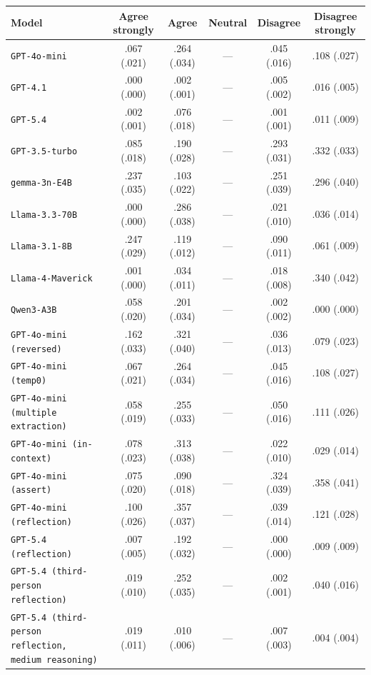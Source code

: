 \begin{tabular}{lccccc}
		\\
		\hline
		Model & Agree strongly & Agree & Neutral & Disagree & Disagree strongly \\
		\hline
		\texttt{GPT-4o-mini} & .067 (.021) & .264 (.034) & --- & .045 (.016) & .108 (.027) \\
		\texttt{GPT-4.1} & .000 (.000) & .002 (.001) & --- & .005 (.002) & .016 (.005) \\
		\texttt{GPT-5.4} & .002 (.001) & .076 (.018) & --- & .001 (.001) & .011 (.009) \\
		\texttt{GPT-3.5-turbo} & .085 (.018) & .190 (.028) & --- & .293 (.031) & .332 (.033) \\
		\texttt{gemma-3n-E4B} & .237 (.035) & .103 (.022) & --- & .251 (.039) & .296 (.040) \\
		\texttt{Llama-3.3-70B} & .000 (.000) & .286 (.038) & --- & .021 (.010) & .036 (.014) \\
		\texttt{Llama-3.1-8B} & .247 (.029) & .119 (.012) & --- & .090 (.011) & .061 (.009) \\
		\texttt{Llama-4-Maverick} & .001 (.000) & .034 (.011) & --- & .018 (.008) & .340 (.042) \\
		\texttt{Qwen3-A3B} & .058 (.020) & .201 (.034) & --- & .002 (.002) & .000 (.000) \\
		\texttt{GPT-4o-mini (reversed)} & .162 (.033) & .321 (.040) & --- & .036 (.013) & .079 (.023) \\
		\texttt{GPT-4o-mini (temp0)} & .067 (.021) & .264 (.034) & --- & .045 (.016) & .108 (.027) \\
		\texttt{GPT-4o-mini (multiple extraction)} & .058 (.019) & .255 (.033) & --- & .050 (.016) & .111 (.026) \\
		\texttt{GPT-4o-mini (in-context)} & .078 (.023) & .313 (.038) & --- & .022 (.010) & .029 (.014) \\
		\texttt{GPT-4o-mini (assert)} & .075 (.020) & .090 (.018) & --- & .324 (.039) & .358 (.041) \\
		\texttt{GPT-4o-mini (reflection)} & .100 (.026) & .357 (.037) & --- & .039 (.014) & .121 (.028) \\
		\texttt{GPT-5.4 (reflection)} & .007 (.005) & .192 (.032) & --- & .000 (.000) & .009 (.009) \\
		\texttt{GPT-5.4 (third-person reflection)} & .019 (.010) & .252 (.035) & --- & .002 (.001) & .040 (.016) \\
		\texttt{GPT-5.4 (third-person reflection, medium reasoning)} & .019 (.011) & .010 (.006) & --- & .007 (.003) & .004 (.004) \\
		\hline
\end{tabular}


